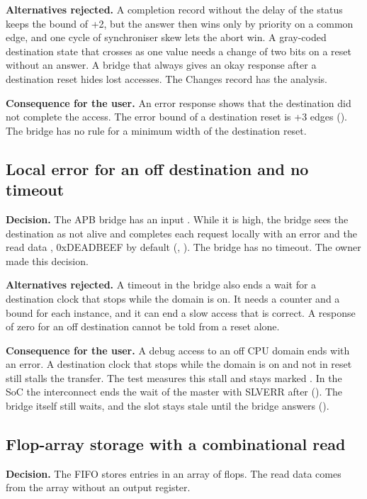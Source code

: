 \textbf{Alternatives rejected.} A completion record without the delay of the status keeps the bound of +2, but the answer then wins only by priority on a common edge, and one cycle of synchroniser skew lets the abort win. A gray-coded destination state that crosses as one value needs a change of two bits on a reset without an answer. A bridge that always gives an okay response after a destination reset hides lost accesses. The Changes record has the analysis.

\textbf{Consequence for the user.} An error response shows that the destination did not complete the access. The error bound of a destination reset is +3 edges (). The bridge has no rule for a minimum width of the destination reset.

\subsection{Local error for an off destination and no timeout}\label{ds:ch:mod-cdc-primitives:dec-off}
\textbf{Decision.} The APB bridge has an input . While it is high, the bridge sees the destination as not alive and completes each request locally with an error and the read data , 0xDEADBEEF by default (, ). The bridge has no timeout. The owner made this decision.

\textbf{Alternatives rejected.} A timeout in the bridge also ends a wait for a destination clock that stops while the domain is on. It needs a counter and a bound for each instance, and it can end a slow access that is correct. A response of zero for an off destination cannot be told from a reset alone.

\textbf{Consequence for the user.} A debug access to an off CPU domain ends with an error. A destination clock that stops while the domain is on and not in reset still stalls the transfer. The test  measures this stall and stays marked . In the SoC the interconnect ends the wait of the master with SLVERR after  (). The bridge itself still waits, and the slot stays stale until the bridge answers ().

\subsection{Flop-array storage with a combinational read}\label{ds:ch:mod-cdc-primitives:dec-storage}
\textbf{Decision.} The FIFO stores entries in an array of flops. The read data comes from the array without an output register.

